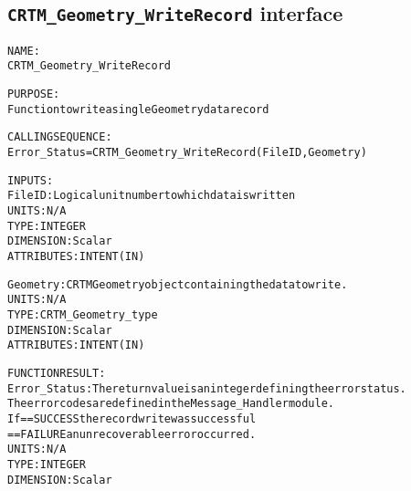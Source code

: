\subsection{\texttt{CRTM\_Geometry\_WriteRecord} interface}
  \label{sec:CRTM_Geometry_WriteRecord_interface}
  \begin{alltt}
 
  NAME:
        CRTM_Geometry_WriteRecord
 
  PURPOSE:
        Function to write a single Geometry data record
 
  CALLING SEQUENCE:
        Error_Status = CRTM_Geometry_WriteRecord( FileID, Geometry )
 
  INPUTS:
        FileID:       Logical unit number to which data is written
                      UNITS:      N/A
                      TYPE:       INTEGER
                      DIMENSION:  Scalar
                      ATTRIBUTES: INTENT(IN)
 
        Geometry:     CRTM Geometry object containing the data to write.
                      UNITS:      N/A
                      TYPE:       CRTM_Geometry_type
                      DIMENSION:  Scalar
                      ATTRIBUTES: INTENT(IN)
 
  FUNCTION RESULT:
        Error_Status: The return value is an integer defining the error status.
                      The error codes are defined in the Message_Handler module.
                      If == SUCCESS the record write was successful
                         == FAILURE an unrecoverable error occurred.
                      UNITS:      N/A
                      TYPE:       INTEGER
                      DIMENSION:  Scalar
  \end{alltt}
